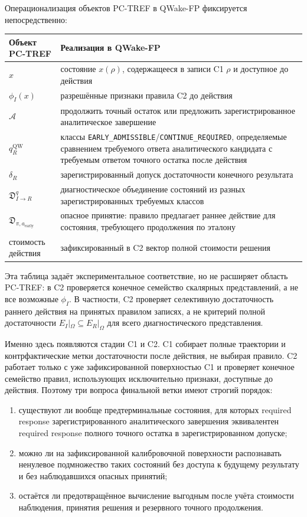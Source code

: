 Операционализация объектов PC-TREF в QWake-FP фиксируется непосредственно:
\begin{center}
\small
\begin{tabular}{p{}p{}}
\toprule
Объект PC-TREF & Реализация в QWake-FP \\
\midrule
$x$ & состояние $x(\rho)$, содержащееся в записи C1 $\rho$ и доступное до действия \\
$\phi_I(x)$ & разрешённые признаки правила C2 до действия \\
$\mathcal A$ & продолжить точный остаток или предложить зарегистрированное аналитическое завершение \\
$q_R^{\mathrm{QW}}$ & классы \texttt{EARLY\_ADMISSIBLE}/\texttt{CONTINUE\_REQUIRED}, определяемые сравнением требуемого ответа аналитического кандидата с требуемым ответом точного остатка после действия \\
$\delta_R$ & зарегистрированный допуск достаточности конечного результата \\
$\mathfrak D_{I\to R}^{q}$ & диагностическое объединение состояний из разных зарегистрированных требуемых классов \\
$\mathfrak D_{\pi,a_{\mathrm{early}}}$ & опасное принятие: правило предлагает раннее действие для состояния, требующего продолжения по эталону \\
стоимость действия & зафиксированный в C2 вектор полной стоимости решения \\
\bottomrule
\end{tabular}
\end{center}
Эта таблица задаёт экспериментальное соответствие, но не расширяет область
PC-TREF: в C2 проверяется конечное семейство скалярных представлений, а не все
возможные $\phi_I$. В частности, C2 проверяет селективную достаточность
раннего действия на принятых правилом записях, а не критерий полной достаточности
$E_I|_\Omega\subseteq E_R|_\Omega$ для всего диагностического представления.

Именно здесь появляются стадии C1 и C2. C1 собирает полные траектории и
контрфактические метки достаточности после действия, не выбирая правило. C2
работает только с уже зафиксированной поверхностью C1 и проверяет конечное
семейство правил, использующих исключительно признаки, доступные до действия.
Поэтому три вопроса финальной ветки имеют строгий порядок:

\begin{enumerate}
  \item существуют ли вообще предтерминальные состояния, для которых required
  response зарегистрированного аналитического завершения эквивалентен required
  response полного точного остатка в зарегистрированном допуске;
  \item можно ли на зафиксированной калибровочной поверхности распознавать
  ненулевое подмножество таких состояний без доступа к будущему результату и без
  наблюдавшихся опасных принятий;
  \item остаётся ли предотвращённое вычисление выгодным после учёта стоимости
  наблюдения, принятия решения и резервного точного продолжения.
\end{enumerate}

